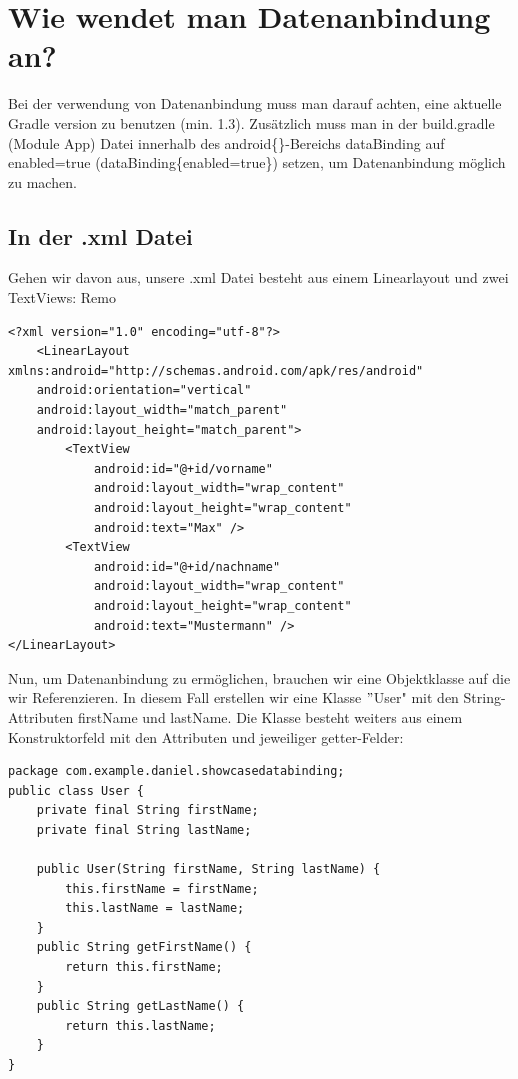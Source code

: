 \documentclass[FIPLY_base.tex]{subfiles}
\begin{document}
\section{Wie wendet man Datenanbindung an?}
Bei der verwendung von Datenanbindung muss man darauf achten, eine aktuelle Gradle version zu benutzen (min. 1.3). Zusätzlich muss man in der build.gradle (Module App) Datei innerhalb des android\{\}-Bereichs dataBinding auf enabled=true (dataBinding\{enabled=true\}) setzen, um Datenanbindung möglich zu machen.
\subsection{In der .xml Datei}
Gehen wir davon aus, unsere .xml Datei besteht aus einem Linearlayout und zwei TextViews: Remo

\begin{lstlisting}[caption={Layoutcode ohne jedliche Datenanbindung.},label=DescriptiveLabel]
<?xml version="1.0" encoding="utf-8"?>
	<LinearLayout xmlns:android="http://schemas.android.com/apk/res/android"
	android:orientation="vertical"
	android:layout_width="match_parent"
	android:layout_height="match_parent">
		<TextView
			android:id="@+id/vorname"
			android:layout_width="wrap_content"
			android:layout_height="wrap_content"
			android:text="Max" />
		<TextView
			android:id="@+id/nachname"
			android:layout_width="wrap_content"
			android:layout_height="wrap_content"
			android:text="Mustermann" />
</LinearLayout>

\end{lstlisting}

Nun, um Datenanbindung zu ermöglichen, brauchen wir eine Objektklasse auf die wir Referenzieren. In diesem Fall erstellen wir eine Klasse $"$User" mit den String-Attributen firstName und lastName. Die Klasse besteht weiters aus einem Konstruktorfeld mit den Attributen und jeweiliger getter-Felder: 

\begin{lstlisting}[caption={Unsere Objektklasse die bei der Datenanbindung referenziert wird.},label=DescriptiveLabel]
package com.example.daniel.showcasedatabinding;
public class User {
    private final String firstName;
    private final String lastName;

    public User(String firstName, String lastName) {
        this.firstName = firstName;
        this.lastName = lastName;
    }
    public String getFirstName() {
        return this.firstName;
    }
    public String getLastName() {
        return this.lastName;
    }
}
\end{lstlisting}
\end{document}
